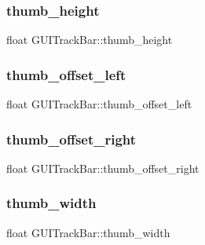 \subsubsection{\texorpdfstring{thumb\+\_\+height}{thumb\_height}}
{\footnotesize\ttfamily float G\+U\+I\+Track\+Bar\+::thumb\+\_\+height}

\hypertarget{class_g_u_i_track_bar_a1c56188be242a20f800a11cfc17c1392}{}\label{class_g_u_i_track_bar_a1c56188be242a20f800a11cfc17c1392} 
\subsubsection{\texorpdfstring{thumb\+\_\+offset\+\_\+left}{thumb\_offset\_left}}
{\footnotesize\ttfamily float G\+U\+I\+Track\+Bar\+::thumb\+\_\+offset\+\_\+left}

\hypertarget{class_g_u_i_track_bar_a52e1eb8a48584bab51616fe0260b34a1}{}\label{class_g_u_i_track_bar_a52e1eb8a48584bab51616fe0260b34a1} 
\subsubsection{\texorpdfstring{thumb\+\_\+offset\+\_\+right}{thumb\_offset\_right}}
{\footnotesize\ttfamily float G\+U\+I\+Track\+Bar\+::thumb\+\_\+offset\+\_\+right}

\hypertarget{class_g_u_i_track_bar_a2f5472c04c8722115751fe22a7432d9e}{}\label{class_g_u_i_track_bar_a2f5472c04c8722115751fe22a7432d9e} 
\subsubsection{\texorpdfstring{thumb\+\_\+width}{thumb\_width}}
{\footnotesize\ttfamily float G\+U\+I\+Track\+Bar\+::thumb\+\_\+width}

\hypertarget{class_g_u_i_track_bar_aadf2e4a9a09064f3b7c2e3c940e07f27}{}\label{class_g_u_i_track_bar_aadf2e4a9a09064f3b7c2e3c940e07f27} 
